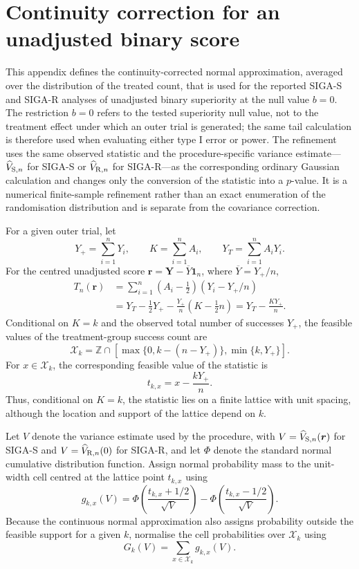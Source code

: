 \documentclass[12pt,a4paper]{article}
\theoremstyle{definition}
\theoremstyle{remark}\newtheorem{remark}{Remark}
\numberwithin{equation}{section}
\begin{document}
\section{Continuity correction for an unadjusted binary score}\label{sec:supp-lattice}

This appendix defines the continuity-corrected normal approximation, averaged over the distribution of the treated count, that is used for the reported SIGA-S and SIGA-R analyses of unadjusted binary superiority at the null value $b=0$. The restriction $b=0$ refers to the tested superiority null value, not to the treatment effect under which an outer trial is generated; the same tail calculation is therefore used when evaluating either type I error or power. The refinement uses the same observed statistic and the procedure-specific variance estimate---$\widehat V_{{\rm S},n}$ for SIGA-S or $\widehat V_{{\rm R},n}$ for SIGA-R---as the corresponding ordinary Gaussian calculation and changes only the conversion of the statistic into a $p$-value. It is a numerical finite-sample refinement rather than an exact enumeration of the randomisation distribution and is separate from the covariance correction.

For a given outer trial, let
\[
Y_+=\sum_{i=1}^nY_i,
\qquad
K=\sum_{i=1}^nA_i,
\qquad
Y_T=\sum_{i=1}^nA_iY_i.
\]
For the centred unadjusted score $\bm r=\bm Y-\overline Y\bm 1_n$, where $\overline Y=Y_+/n$,
\begin{align}
T_n(\bm r)&=\sum_{i=1}^n(A_i-\tfrac12)(Y_i-Y_+/n)\nonumber\\
 &=Y_T-\frac12Y_+-\frac{Y_+}{n}(K-\tfrac12n)
 =Y_T-\frac{KY_+}{n}.
\label{eq:supp-binarylattice}
\end{align}
Conditional on $K=k$ and the observed total number of successes $Y_+$, the feasible values of the treatment-group success count are
\[
\mathcal X_k=\mathbb Z\cap[\max\{0,k-(n-Y_+)\},\min\{k,Y_+\}].
\]
For $x\in\mathcal X_k$, the corresponding feasible value of the statistic is
\[
t_{k,x}=x-\frac{kY_+}{n}.
\]
Thus, conditional on $K=k$, the statistic lies on a finite lattice with unit spacing, although the location and support of the lattice depend on $k$.

Let $V$ denote the variance estimate used by the procedure, with $V=\widehat V_{{\rm S},n}(\bm r)$ for SIGA-S and $V=\widehat V_{{\rm R},n}(0)$ for SIGA-R, and let $\Phi$ denote the standard normal cumulative distribution function. Assign normal probability mass to the unit-width cell centred at the lattice point $t_{k,x}$ using
\begin{equation}\label{eq:supp-cellmass}
g_{k,x}(V)
=
\Phi\left(\frac{t_{k,x}+1/2}{\sqrt V}\right)
-
\Phi\left(\frac{t_{k,x}-1/2}{\sqrt V}\right).
\end{equation}
Because the continuous normal approximation also assigns probability outside the feasible support for a given $k$, normalise the cell probabilities over $\mathcal X_k$ using
\[
G_k(V)=\sum_{x\in\mathcal X_k}g_{k,x}(V).
\]
\end{document}
